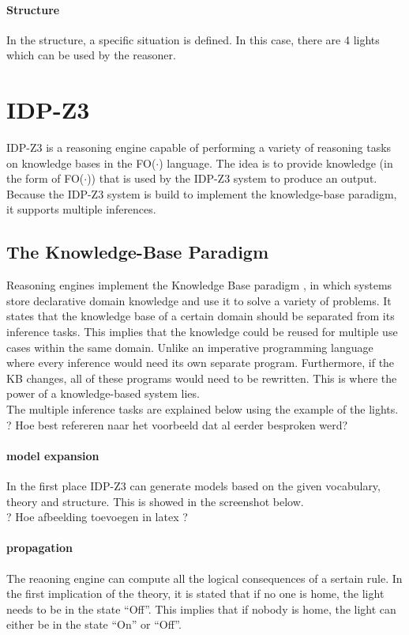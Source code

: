 \documentclass[11pt,a4paper]{report}
\newcommand{\fodot}{FO($\cdot$)\xspace}
\begin{document}
\paragraph{Structure}
In the structure, a specific situation is defined. In this case, there are 4 lights which can be used by the reasoner.

\newpage

\section{IDP-Z3}
IDP-Z3 \cite{IDPZ3ReasoningEngine} is a reasoning engine capable of performing a variety of reasoning tasks on knowledge bases in the \fodot language. The idea is to provide knowledge (in the form of \fodot) that is used by the IDP-Z3 system to produce an output. Because the IDP-Z3 system is build to implement the knowledge-base paradigm, it supports multiple inferences.

\subsection{The Knowledge-Base Paradigm}
Reasoning engines implement the Knowledge Base paradigm \cite{IDPZ3KBParadigm}, in which systems store declarative domain knowledge and use it to solve a variety of problems. It states that the knowledge base of a certain domain should be separated from its inference tasks. This implies that the knowledge could be reused for multiple use cases within the same domain. Unlike an imperative programming language where every inference would need its own separate program. Furthermore, if the KB changes, all of these programs would need to be rewritten. This is where the power of a knowledge-based system lies.\\
The multiple inference tasks are explained below using the example of the lights.\\
? Hoe best refereren naar het voorbeeld dat al eerder besproken werd?

\paragraph{model expansion}
In the first place IDP-Z3 can generate models based on the given vocabulary, theory and structure. This is showed in the screenshot below.\\
? Hoe afbeelding toevoegen in latex ?

\paragraph{propagation}
The reaoning engine can compute all the logical consequences of a sertain rule. In the first implication of the theory, it is stated that if no one is home, the light needs to be in the state ``Off''. This implies that if nobody is home, the light can either be in the state ``On'' or ``Off''.
\end{document}
